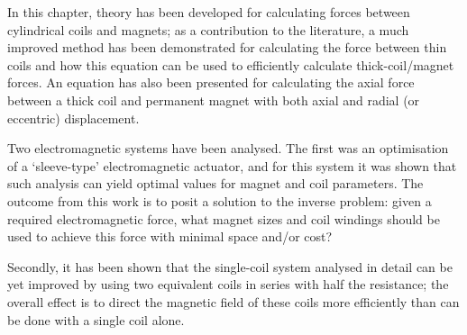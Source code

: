 \documentclass[11pt,a4paper]{memoir}
\begin{document}
In this chapter, theory has been developed for calculating forces between cylindrical coils and magnets; as a contribution to the literature, a much improved method has been demonstrated for calculating the force between thin coils and how this equation can be used to efficiently calculate thick-coil/magnet forces.
An equation has also been presented for calculating the axial force between a thick coil and permanent magnet with both axial and radial (or eccentric) displacement.

Two electromagnetic systems have been analysed.
The first was an optimisation of a `sleeve-type' electromagnetic actuator, and for this system it was shown that such analysis can yield optimal values for magnet and coil parameters.
The outcome from this work is to posit a solution to the inverse problem: given a required electromagnetic force, what magnet sizes and coil windings should be used to achieve this force with minimal space and/or cost?

Secondly, it has been shown that the single-coil system analysed in detail can be yet improved by using two equivalent coils in series with half the resistance; the overall effect is to direct the magnetic field of these coils more efficiently than can be done with a single coil alone.
\end{document}
